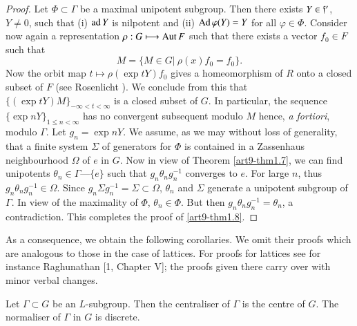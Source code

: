 \begin{proof}
Let $\Phi \subset \Gamma$ be a maximal unipotent subgroup. Then there exists $Y \in \mathfrak{f}'$, $Y \neq 0$, such that (i) $\operatorname{ad} Y$ is nilpotent and (ii) $\operatorname{Ad} \varphi (Y) = Y$ for all $\varphi \in \Phi$. Consider now again a representation $\rho : G \longmapsto \operatorname{Aut} F$  such that there exists a vector $f_0 \in F$ such that
$$
M = \{M \in G \big|~ \rho (x) f_0 = f_0\}.
$$
Now the orbit map $t \longmapsto \rho (\exp t Y) f_0$ gives a homeomorphism of $R$ onto a closed subset of $F$ (see Rosenlicht \cite{art9-key2}). We conclude from this that $\{(\exp t Y) M\}_{- \infty < t < \infty}$ is a closed subset of $G$. In particular, the sequence\pageoriginale $\{\exp n Y\}_{1 \leqslant n < \infty}$ has no convergent subsequent modulo $M$ hence, \textit{a fortiori}, modulo $\Gamma$. Let $g_n = \exp n Y$. We assume, as we may without loss of generality, that a finite system $\Sigma$ of generators for $\Phi$ is contained in a Zassenhaus neighbourhood $\Omega$ of $e$ in $G$. Now in view of Theorem \ref{art9-thm1.7}, we can find unipotents $\theta_n \in \Gamma$---$\{e\}$ such that $g_n \theta_n g^{-1}_n$ converges to $e$. For large $n$, thus $g_n \theta_n g^{-1}_n \in \Omega$. Since $g_n \Sigma g^{-1}_n = \Sigma \subset \Omega$, $\theta_n$ and $\Sigma$ generate a unipotent subgroup of $\Gamma$. In view of the maximality of $\Phi$, $\theta_n \in \Phi$. But then $g_n \theta_n g^{-1}_n = \theta_n$, a contradiction. This completes the proof of \ref{art9-thm1.8}.
\end{proof}

As a consequence, we obtain the following corollaries. We omit their proofs which are analogous to those in the case of lattices. For proofs for lattices see for instance Raghunathan [1, Chapter V]; the proofs given there carry over with minor verbal changes.


\begin{coro}\label{art9-coro1.9}
Let $\Gamma \subset G$ be an $L$-subgroup. Then the centraliser of $\Gamma$ is the centre of $G$. The normaliser of $\Gamma$ in $G$ is discrete.
\end{coro}

